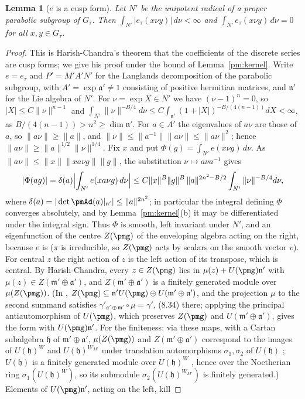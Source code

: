 \documentclass[10pt]{amsart}
\newtheorem{lemma}[theorem]{Lemma}
\theoremstyle{definition}
\theoremstyle{remark}
\begin{document}
\begin{lemma}[$e$ is a cusp form]\label{pm:cusp}
Let $N'$ be the unipotent radical of a proper parabolic subgroup of $G_\tau$. Then
$\int_{N'}|e_\tau(x\nu y)|\,d\nu<\infty$ and $\int_{N'}e_\tau(x\nu y)\,d\nu=0$ for all $x,y\in G_\tau$.
\end{lemma}
\begin{proof}
This is Harish-Chandra's theorem that the coefficients of the discrete series are cusp forms; we
give his proof under the bound of Lemma~\ref{pm:kernel}. Write $e=e_\tau$ and $P'=M'A'N'$ for the
Langlands decomposition of the parabolic subgroup, with $A'=\exp\mathfrak a'\ne1$ consisting of
positive hermitian matrices, and $\mathfrak n'$ for the Lie algebra of $N'$. For
$\nu=\exp X\in N'$ we have $(\nu-1)^{n}=0$, so $|X|\le C\|\nu\|^{n-1}$ and
$\int_{N'}\|\nu\|^{-B/4}d\nu\le C\int_{\mathfrak n'}(1+|X|)^{-B/(4(n-1))}dX<\infty$, as
$B/(4(n-1))>n^2\ge\dim\mathfrak n'$. For $a\in A'$ the eigenvalues of $a\nu$ are those of $a$, so
$\|a\nu\|\ge\|a\|$, and $\|\nu\|\le\|a^{-1}\|\|a\nu\|\le\|a\nu\|^2$; hence
$\|a\nu\|\ge\|a\|^{1/2}\|\nu\|^{1/4}$. Fix $x$ and put $\Phi(g)=\int_{N'}e(x\nu g)\,d\nu$. As
$\|a\nu\|\le\|x\|\|xa\nu g\|\|g\|$, the substitution $\nu\mapsto a\nu a^{-1}$ gives
\begin{equation}\label{pm:eq-cuspdecay}
|\Phi(ag)|=\delta(a)\Bigl|\int_{N'}e(xa\nu g)\,d\nu\Bigr|\le C\|x\|^B\|g\|^B\,\|a\|^{2n^2-B/2}
\int_{N'}\|\nu\|^{-B/4}d\nu ,
\end{equation}
where $\delta(a)=|\det\pmAd(a)|_{\mathfrak n'}|\le\|a\|^{2n^2}$; in particular the integral defining
$\Phi$ converges absolutely, and by Lemma~\ref{pm:kernel}(b) it may be differentiated under the
integral sign. Thus $\Phi$ is smooth, left invariant under $N'$, and an eigenfunction of the
centre $Z(\pmg)$ of the enveloping algebra acting on the right, because $e$ is ($\pi$ is
irreducible, so $Z(\pmg)$ acts by scalars on the smooth vector $v$). For central $z$ the right
action of $z$ is the left action of its transpose, which is central. By Harish-Chandra, every $z\in Z(\pmg)$ lies in $\mu(z)+U(\pmg)\mathfrak n'$ with
$\mu(z)\in Z(\mathfrak m'\oplus\mathfrak a')$, and $Z(\mathfrak m'\oplus\mathfrak a')$ is a finitely
generated module over $\mu(Z(\pmg))$. (In \cite[proof of Proposition~8.22, p.~225]{Knapp}, $Z(\pmg)\subseteq\mathfrak n'U(\pmg)\oplus U(\mathfrak m'\oplus\mathfrak a')$, and the projection $\mu$ to the second summand satisfies $\gamma'_{\mathfrak a'\oplus\mathfrak m'}\circ\mu=\gamma'$, (8.34) there; applying the principal antiautomorphism of $U(\pmg)$, which preserves $Z(\pmg)$ and $U(\mathfrak m'\oplus\mathfrak a')$, gives the form with $U(\pmg)\mathfrak n'$. For the finiteness: via these maps, with a Cartan subalgebra $\mathfrak h$ of $\mathfrak m'\oplus\mathfrak a'$, $\mu(Z(\pmg))$ and $Z(\mathfrak m'\oplus\mathfrak a')$ correspond to the images of $U(\mathfrak h)^W$ and $U(\mathfrak h)^{W_{M'}}$ under translation automorphisms $\sigma_1,\sigma_2$ of $U(\mathfrak h)$ \cite[Theorem~8.18]{Knapp}; $U(\mathfrak h)$ is a finitely generated module over $U(\mathfrak h)^W$ \cite[Theorem~8.19]{Knapp}, hence over the Noetherian ring $\sigma_1(U(\mathfrak h)^W)$, so its submodule $\sigma_2(U(\mathfrak h)^{W_{M'}})$ is finitely generated.) Elements of $U(\pmg)\mathfrak n'$, acting on the left, kill

\end{proof}
\end{document}

